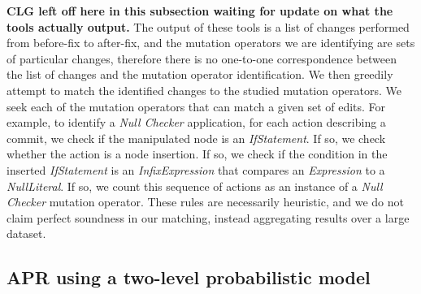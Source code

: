 \documentclass[conference]{IEEEtran}
\newcommand{\todo}[1]
  {{\scriptsize \textbf{\color{red} {#1}}}}
\begin{document}
\todo{CLG left off here in this subsection waiting for update on what the tools
  actually output.}
The output of these tools is a list of changes performed from before-fix to after-fix, and the mutation operators we are identifying are sets of particular changes, therefore there is no one-to-one correspondence between the list of changes and the mutation operator identification. We then greedily attempt to match the identified changes to the
studied
mutation operators. We seek each of the mutation operators that can match a given set
of edits.  For example, to identify
a \emph{Null Checker} application, for each action describing a commit, we check
if the manipulated node
is an \emph{IfStatement}.  If so, we check whether the action
is a node insertion.  If so, we check if the condition in the inserted
\emph{IfStatement} is an 
\emph{InfixExpression} that compares an 
\emph{Expression} to a
\emph{NullLiteral}. If so, we count this sequence of
actions as an instance of a \emph{Null Checker} mutation operator.  These rules are
necessarily heuristic, and we do not claim perfect soundness in our matching,
instead aggregating results over a large dataset.  






\subsection{APR using a two-level probabilistic model}
\end{document}
